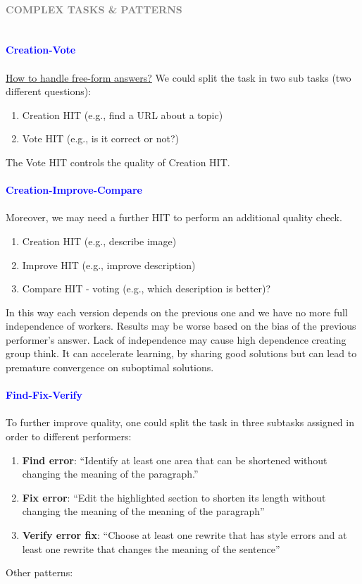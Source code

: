\documentclass[10pt,a4paper]{article}
\newcommand{\nline}{\\~\\}
\newcommand{\myparagraph}[1]{\paragraph{\normalsize{\textcolor{gray}{\uppercase{\textbf{#1}}}} }\mbox{} \vspace{0.5em}\\}
\begin{document}
\myparagraph{Complex Tasks \& Patterns}
\textbf{\textcolor{blue}{Creation-Vote}} \nline
\uline{How to handle free-form answers?}
We could split the task in two sub tasks (two different questions):
\begin{enumerate}
	\item Creation HIT (e.g., find a URL about a topic)
	\item Vote HIT (e.g., is it correct or not?)
\end{enumerate}
The Vote HIT controls the quality of Creation HIT.
\nline
\textbf{\textcolor{blue}{Creation-Improve-Compare}} \nline
Moreover, we may need a further HIT to perform an additional quality check.
\begin{enumerate}
	\item Creation HIT (e.g., describe image)
	\item Improve HIT (e.g., improve description)
	\item Compare HIT - voting (e.g., which description is better)?
\end{enumerate}
In this way each version depends on the previous one and we have no more full independence of workers. Results may be worse based on the bias of the previous performer’s answer. Lack of independence may cause high dependence creating group think. It can accelerate learning, by sharing good solutions but can lead to premature convergence on suboptimal solutions.
\nline
\textbf{\textcolor{blue}{Find-Fix-Verify}} \nline
To further improve quality, one could split the task in three subtasks
 assigned in order to different performers:
\begin{enumerate}
	\item \textbf{Find error}: “Identify at least one area that can be shortened without changing the meaning of the paragraph.”
	\item \textbf{Fix error}: “Edit the highlighted section to shorten its length without changing the meaning of the meaning of the paragraph”
	\item \textbf{Verify error fix}: “Choose at least one rewrite that has style errors and at least one rewrite that changes the meaning of the sentence”
\end{enumerate}
\noindent
Other patterns:
\end{document}

